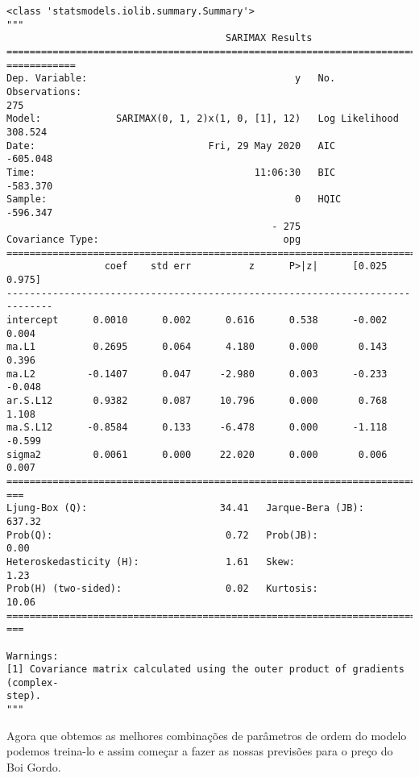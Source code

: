 \documentclass[11pt]{article}
\makeatletter
\newcommand{\boxspacing}{\kern\kvtcb@left@rule\kern\kvtcb@boxsep}
\newcommand{\prompt}[4]{
        \ttfamily\llap{{\color{#2}[#3]:\hspace{3pt}#4}}\vspace{-\baselineskip}
    }
\makeatother
\begin{document}
            \begin{tcolorbox}[breakable, size=fbox, boxrule=.5pt, pad at break*=1mm, opacityfill=0]
\prompt{Out}{outcolor}{33}{\boxspacing}
\begin{Verbatim}[commandchars=\\\{\}]
<class 'statsmodels.iolib.summary.Summary'>
"""
                                      SARIMAX Results
================================================================================
============
Dep. Variable:                                    y   No. Observations:
275
Model:             SARIMAX(0, 1, 2)x(1, 0, [1], 12)   Log Likelihood
308.524
Date:                              Fri, 29 May 2020   AIC
-605.048
Time:                                      11:06:30   BIC
-583.370
Sample:                                           0   HQIC
-596.347
                                              - 275
Covariance Type:                                opg
==============================================================================
                 coef    std err          z      P>|z|      [0.025      0.975]
------------------------------------------------------------------------------
intercept      0.0010      0.002      0.616      0.538      -0.002       0.004
ma.L1          0.2695      0.064      4.180      0.000       0.143       0.396
ma.L2         -0.1407      0.047     -2.980      0.003      -0.233      -0.048
ar.S.L12       0.9382      0.087     10.796      0.000       0.768       1.108
ma.S.L12      -0.8584      0.133     -6.478      0.000      -1.118      -0.599
sigma2         0.0061      0.000     22.020      0.000       0.006       0.007
================================================================================
===
Ljung-Box (Q):                       34.41   Jarque-Bera (JB):
637.32
Prob(Q):                              0.72   Prob(JB):
0.00
Heteroskedasticity (H):               1.61   Skew:
1.23
Prob(H) (two-sided):                  0.02   Kurtosis:
10.06
================================================================================
===

Warnings:
[1] Covariance matrix calculated using the outer product of gradients (complex-
step).
"""
\end{Verbatim}
\end{tcolorbox}
        
    Agora que obtemos as melhores combinações de parâmetros de ordem do
modelo podemos treina-lo e assim começar a fazer as nossas previsões
para o preço do Boi Gordo.
\end{document}
